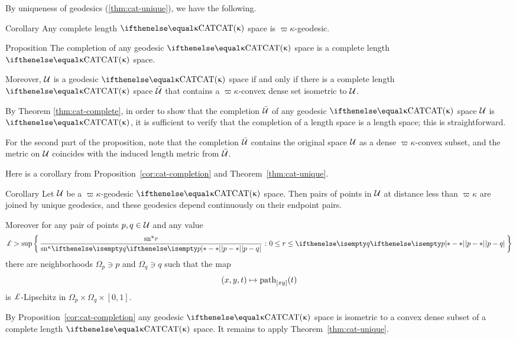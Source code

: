 By uniqueness of geodesics (\ref{thm:cat-unique}),
we have the following.

\begin{thm}{Corollary}\label{cor:cat-ccat}
Any  complete length $\CAT\kappa$ space is $\varpi\kappa$-geodesic.

\end{thm}

\begin{thm}{Proposition}\label{cor:cat-completion} 
The completion of any geodesic $\CAT{\kappa}$ space is a complete length $\CAT\kappa$ space.

Moreover, $\mathcal{U}$ is a geodesic $\CAT\kappa$ space
if and only if there is a complete length $\CAT\kappa$ space $\bar{\mathcal{U}}$ that contains a $\varpi\kappa$-convex dense set isometric to $\mathcal{U}$.
\end{thm}

By Theorem \ref{thm:cat-complete},
in order to show that the completion $\bar{\mathcal{U}}$ of any geodesic $\CAT\kappa$ space $\mathcal{U}$ is $\CAT{\kappa}$,
it is sufficient to verify that the completion of a length space is a length space; 
this is straightforward.

For the second part of the proposition, note that the completion $\bar{\mathcal{U}}$
contains the original space $\mathcal{U}$ as a dense $\varpi\kappa$-convex subset, and the metric on $\mathcal{U}$ coincides with the induced length metric from $\bar{\mathcal{U}}$.
\qeds

Here is a corollary from Proposition~\ref{cor:cat-completion}
and Theorem~\ref{thm:cat-unique}.

\begin{thm}{Corollary}\label{cor:cat-unique}
Let $\mathcal{U}$ be a  $\varpi\kappa$-geodesic $\CAT\kappa$ space.
Then pairs of points in $\mathcal{U}$ at distance less than $\varpi\kappa$ are joined by unique geodesics, and these geodesics depend continuously on their endpoint pairs.

Moreover for any pair of points $p,q\in \spc{U}$ and any value
\[\Lip>\sup\set{\frac{\sn\kappa r}{\sn\kappa \dist{p}{q}{}}}{0\le r\le \dist{p}{q}{}}\]
there are neighborhoods $\Omega_p\ni p$ and $\Omega_q\ni q$ such that the map
\[(x,y,t)\mapsto \geodpath_{[xy]}(t)\]
is $\Lip$-Lipschitz in $\Omega_p\times \Omega_q\times[0,1]$.
\end{thm}

By Proposition~\ref{cor:cat-completion} any geodesic $\CAT{\kappa}$ space is isometric to a convex dense subset of a complete length $\CAT\kappa$ space.
It remains to apply  Theorem~\ref{thm:cat-unique}.
\qeds


